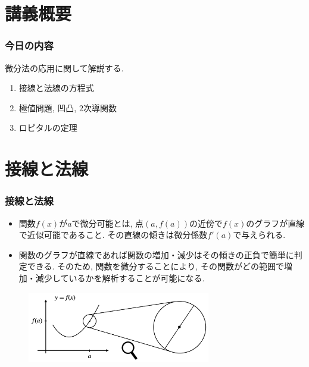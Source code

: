 \section{講義概要}


\begin{frame}
\frametitle{今日の内容}


微分法の応用に関して解説する. 
\begin{enumerate}
\item 接線と法線の方程式
\item 極値問題, 凹凸, $2$次導関数
\item ロピタルの定理
\end{enumerate} 



\end{frame}









\section{接線と法線}


\begin{frame}
\frametitle{接線と法線}

\begin{itemize}
\item 関数$f(x)$が$a$で微分可能とは, 点$(a,f(a))$の近傍で$f(x)$のグラフが直線で近似可能であること. 
その直線の傾きは微分係数$f'(a)$で与えられる.  
\item 関数のグラフが直線であれば関数の増加・減少はその傾きの正負で簡単に判定できる.  
そのため, 関数を微分することにより, その関数がどの範囲で増加・減少しているかを解析することが可能になる. 
\end{itemize}

 \begin{figure}[htbp]
 \begin{center} 
  \includegraphics[width=80mm]{calculus7/differentiable2.png}
 \end{center}
\end{figure}




\end{frame}



